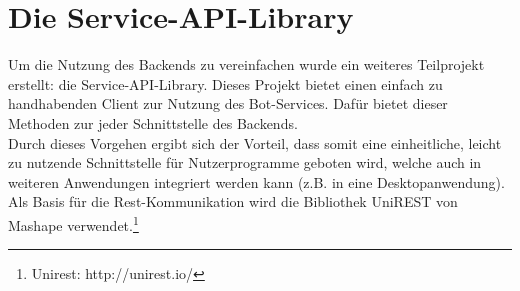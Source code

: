 \section{Die Service-API-Library}
Um die Nutzung des Backends zu vereinfachen wurde ein weiteres Teilprojekt erstellt: die Service-API-Library. Dieses Projekt bietet einen einfach zu handhabenden Client zur Nutzung des Bot-Services. Dafür bietet dieser Methoden zur jeder Schnittstelle des Backends.\\
Durch dieses Vorgehen ergibt sich der Vorteil, dass somit eine einheitliche, leicht zu nutzende Schnittstelle für Nutzerprogramme geboten wird, welche auch in weiteren Anwendungen integriert werden kann (z.B. in eine Desktopanwendung).\\
Als Basis für die Rest-Kommunikation wird die Bibliothek UniREST von Mashape verwendet.\footnote{Unirest: http://unirest.io/}\\